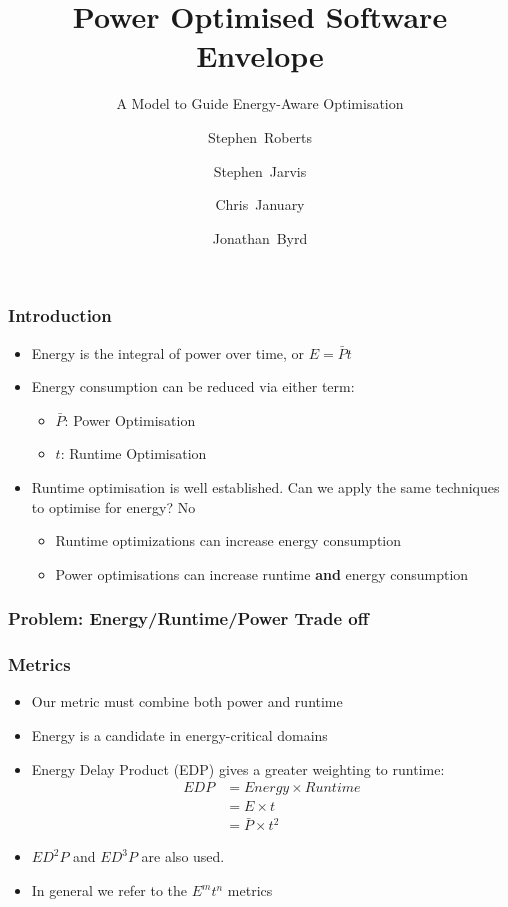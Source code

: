 \documentclass{beamer}
\title[POSE] %
{Power Optimised Software Envelope}
\subtitle{A Model to Guide Energy-Aware Optimisation}
\author[Roberts et al.] %
{Stephen~Roberts\inst{1} \and Stephen~Jarvis\inst{1} \\
 \and Chris~January\inst{1} \and Jonathan~Byrd\inst{2}}
\institute[Universities Here and There] %
{
    \inst{1}%
      Department of Computer Science\\
      The University of Warwick
    \and
      \inst{2}%
        Allinea Software
}
\begin{document}
  \frame{\titlepage}
  \begin{frame}
    \frametitle{Introduction}
    \begin{itemize}
      \item Energy is the integral of power over time, or $E = \bar{P}t$
      \item Energy consumption can be reduced via either term:
      \begin{itemize}
        \item $\bar{P}$: Power Optimisation
        \item $t$: Runtime Optimisation
      \end{itemize}
      \item Runtime optimisation is well established. Can we apply the same techniques to optimise for energy? No
       \begin{itemize}
        \item Runtime optimizations can increase energy consumption
        \item Power optimisations can increase runtime \textbf{and} energy consumption
      \end{itemize}
    \end{itemize}
  \end{frame}
  
  \begin{frame}
    \frametitle{Problem: Energy/Runtime/Power Trade off}
    \begin{figure}
    \centering
    
    \end{figure}
  \end{frame}

  \begin{frame}
  \frametitle{Metrics}
  \begin{itemize}
  \item Our metric must combine both power and runtime
  \item Energy is a candidate in energy-critical domains
  \item Energy Delay Product (EDP) gives a greater weighting to runtime:
  \begin{align}
    EDP &= Energy \times Runtime \nonumber \\
        &= E \times t \nonumber \\
        &= \bar{P} \times t^2
  \end{align}
  \item $ED^2P$ and $ED^3P$ are also used.
  \item In general we refer to the $E^mt^n$ metrics 
  \end{itemize}
  \end{frame}
\end{document}
